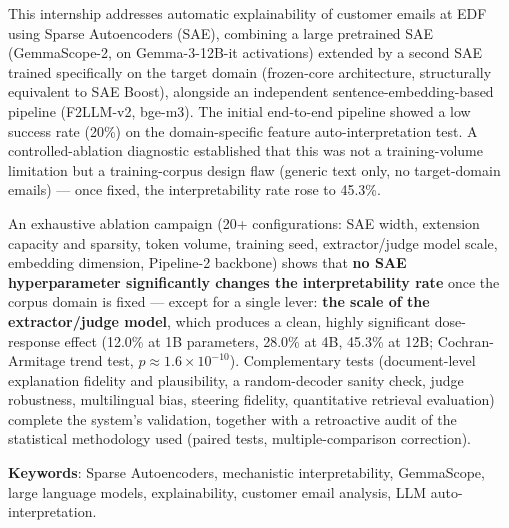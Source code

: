 \documentclass[11pt]{article}
\begin{document}
This internship addresses automatic explainability of customer emails at EDF
using Sparse Autoencoders (SAE), combining a large pretrained SAE
(GemmaScope-2, on Gemma-3-12B-it activations) extended by a second SAE
trained specifically on the target domain (frozen-core architecture,
structurally equivalent to SAE Boost), alongside an independent
sentence-embedding-based pipeline (F2LLM-v2, bge-m3). The initial end-to-end
pipeline showed a low success rate (20\%) on the domain-specific feature
auto-interpretation test. A controlled-ablation diagnostic established that
this was not a training-volume limitation but a training-corpus design flaw
(generic text only, no target-domain emails) --- once fixed, the
interpretability rate rose to 45.3\%.

An exhaustive ablation campaign (20+ configurations: SAE width, extension
capacity and sparsity, token volume, training seed, extractor/judge model
scale, embedding dimension, Pipeline-2 backbone) shows that \textbf{no SAE
hyperparameter significantly changes the interpretability rate} once the
corpus domain is fixed --- except for a single lever: \textbf{the scale of the
extractor/judge model}, which produces a clean, highly significant
dose-response effect (12.0\% at 1B parameters, 28.0\% at 4B, 45.3\% at 12B;
Cochran-Armitage trend test, $p \approx 1.6\times10^{-10}$). Complementary
tests (document-level explanation fidelity and plausibility, a random-decoder
sanity check, judge robustness, multilingual bias, steering fidelity,
quantitative retrieval evaluation) complete the system's validation, together
with a retroactive audit of the statistical methodology used (paired tests,
multiple-comparison correction).

\textbf{Keywords}: Sparse Autoencoders, mechanistic interpretability,
GemmaScope, large language models, explainability, customer email analysis,
LLM auto-interpretation.

\newpage
\tableofcontents
\newpage
\listoffigures
\listoftables
\newpage
\end{document}
